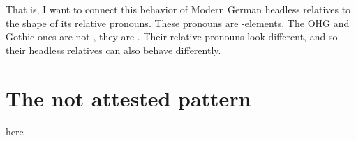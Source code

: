 That is, I want to connect this behavior of Modern German headless relatives to the shape of its relative pronouns. These pronouns are -elements. The OHG and Gothic ones are not , they are . Their relative pronouns look different, and so their headless relatives can also behave differently.

\section{The not attested pattern}

here

